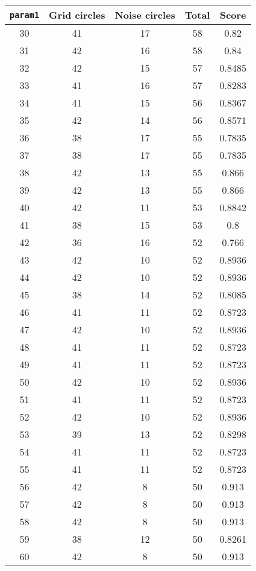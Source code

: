 \documentclass[letterpaper, 12pt]{article}
\begin{document}
\begin{longtable}{|c|c|c|c|c|}
\hline
\textbf{\texttt{param1}} & \textbf{Grid circles} & \textbf{Noise circles} & \textbf{Total} & \textbf{Score} \\
\hline
30 & 41 & 17 & 58 & 0.82 \\
\hline
31 & 42 & 16 & 58 & 0.84 \\
\hline
32 & 42 & 15 & 57 & 0.8485 \\
\hline
33 & 41 & 16 & 57 & 0.8283 \\
\hline
34 & 41 & 15 & 56 & 0.8367 \\
\hline
35 & 42 & 14 & 56 & 0.8571 \\
\hline
36 & 38 & 17 & 55 & 0.7835 \\
\hline
37 & 38 & 17 & 55 & 0.7835 \\
\hline
38 & 42 & 13 & 55 & 0.866 \\
\hline
39 & 42 & 13 & 55 & 0.866 \\
\hline
40 & 42 & 11 & 53 & 0.8842 \\
\hline
41 & 38 & 15 & 53 & 0.8 \\
\hline
42 & 36 & 16 & 52 & 0.766 \\
\hline
43 & 42 & 10 & 52 & 0.8936 \\
\hline
44 & 42 & 10 & 52 & 0.8936 \\
\hline
45 & 38 & 14 & 52 & 0.8085 \\
\hline
46 & 41 & 11 & 52 & 0.8723 \\
\hline
47 & 42 & 10 & 52 & 0.8936 \\
\hline
48 & 41 & 11 & 52 & 0.8723 \\
\hline
49 & 41 & 11 & 52 & 0.8723 \\
\hline
50 & 42 & 10 & 52 & 0.8936 \\
\hline
51 & 41 & 11 & 52 & 0.8723 \\
\hline
52 & 42 & 10 & 52 & 0.8936 \\
\hline
53 & 39 & 13 & 52 & 0.8298 \\
\hline
54 & 41 & 11 & 52 & 0.8723 \\
\hline
55 & 41 & 11 & 52 & 0.8723 \\
\hline
56 & 42 & 8 & 50 & 0.913 \\
\hline
57 & 42 & 8 & 50 & 0.913 \\
\hline
58 & 42 & 8 & 50 & 0.913 \\
\hline
59 & 38 & 12 & 50 & 0.8261 \\
\hline
60 & 42 & 8 & 50 & 0.913 \\
\hline

\end{longtable}
\end{document}
